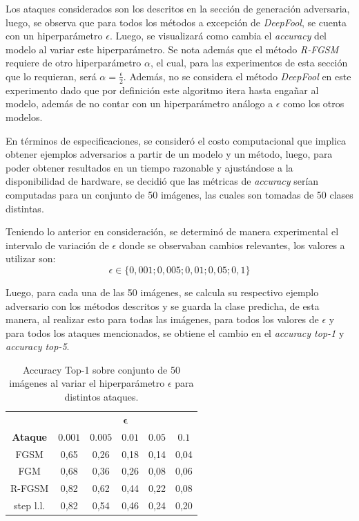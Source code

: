 \documentclass[conference]{IEEEtran}
\begin{document}
Los ataques considerados son los descritos en la sección de generación adversaria, luego, se observa que para todos los métodos a excepción de \textit{DeepFool}, se cuenta con un hiperparámetro $\epsilon$. Luego, se visualizará como cambia el \textit{accuracy} del modelo al variar este hiperparámetro. Se nota además que el método \textit{R-FGSM} requiere de otro hiperparámetro $\alpha$, el cual, para las experimentos de esta sección que lo requieran, será $\alpha = \frac{\epsilon}{2}$. Además, no se considera el método \textit{DeepFool} en este experimento dado que por definición este algoritmo itera hasta engañar al modelo, además de no contar con un hiperparámetro análogo a $\epsilon$ como los otros modelos.

En términos de especificaciones, se consideró el costo computacional que implica obtener ejemplos adversarios a partir de un modelo y un método, luego, para poder obtener resultados en un tiempo razonable y ajustándose a la disponibilidad de hardware, se decidió que las métricas de \textit{accuracy} serían computadas para un conjunto de 50 imágenes, las cuales son tomadas de 50 clases distintas. 

Teniendo lo anterior en consideración, se determinó de manera experimental el intervalo de variación de $\epsilon$ donde se observaban cambios relevantes, los valores a utilizar son:
\[
\epsilon \in \{0,001 ; 0,005 ; 0,01 ; 0,05 ; 0,1 \}
\]

Luego, para cada una de las 50 imágenes, se calcula su respectivo ejemplo adversario con los métodos descritos y se guarda la clase predicha, de esta manera, al realizar esto para todas las imágenes, para todos los valores de $\epsilon$ y para todos los ataques mencionados, se obtiene el cambio en el \textit{accuracy top-1} y \textit{accuracy top-5}.

\begin{table}[!t]
    \centering
    \caption{Accuracy Top-1 sobre conjunto de 50 imágenes al variar el hiperparámetro $\epsilon$ para distintos ataques.}
    \label{adv_top1_table}
    \begin{tabular}{cccccc} 
    \toprule 
     & \multicolumn{5}{c}{$\bm{\epsilon}$} \\ \cmidrule{2-6}
    \textbf{Ataque} & $0.001$ & $0.005$ & $0.01$ & $0.05$ & $0.1$ \\ \midrule
    FGSM & 0,65 & 0,26 & 0,18 & 0,14 & 0,04 \\ 
    FGM & 0,68 & 0,36 & 0,26 & 0,08 & 0,06 \\ 
    R-FGSM & 0,82 & 0,62 & 0,44 & 0,22 & 0,08 \\
    step l.l. & 0,82 & 0,54 & 0,46 & 0,24 & 0,20 \\ \bottomrule
    \end{tabular}
\end{table}
\end{document}
